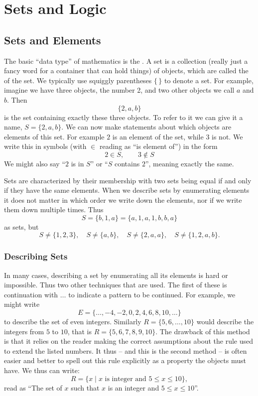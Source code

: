 \chapter{Sets and Logic}
\label{chsets}

\section{Sets and Elements}

The basic ``data type'' of mathematics is the . A set is a
collection (really just a fancy word for a container that can hold things)
of objects, which are called the  of the set. 
We typically use squiggly parentheses $\{\,\}$ to denote a set.
For example,
imagine we have three objects, the number 2, and two other objects we call
$a$ and $b$. Then 
\[
\{2,a,b\}
\]
is the set containing exactly these three objects. To refer to it we can give it
a name, $S=\{2,a,b\}$. 
We can now make statements about which objects are elements of this set. For
example $2$ is an element of the set, while $3$ is not. We write this in
symbols (with $\in$ reading as ``is element of'') in the form
\[
2\in S,\qquad 3\not\in S
\]
We might also say ``$2$ is in $S$'' or ``$S$ contains $2$'', meaning exactly
the same.

Sets are characterized by their membership with two sets being equal if and
only if they have the same elements.
When we describe sets
by enumerating elements it does not matter in which order we write down the
elements, nor if we write them down multiple times.
Thus
\[
S=\{b,1,a\}=\{a,1,a,1,b,b,a\}
\]
as sets, but 
\[
S\not=\{1,2,3\},\quad S\not=\{a,b\},\quad S\not=\{2,a,a\},\quad
S\not=\{1,2,a,b\}.
\]

\subsection{Describing Sets}

In many cases, describing a set by enumerating all its elements is
hard or impossible. Thus two other techniques that are used. The first of
these is continuation with
$\ldots$ to indicate a pattern to be continued. For example, we might write
\[
E=\{\ldots,-4,-2,0,2,4,6,8,10,\ldots\}
\]
to describe the set of even integers. Similarly
$R=\{5,6,\ldots,10\}$ would describe the integers from $5$ to $10$, that is
$R=\{5,6,7,8,9,10\}$. The drawback of this method is that it relies on the
reader making the correct assumptions about the rule used to extend the
listed numbers. It thus -- and this is the second method -- is often easier
and better to spell out this rule explicitly as a property the objects must
have. We thus can write:
\[
R=\{x\mid \mbox{$x$ is integer and $5\le x\le 10$}\},
\]
read as ``The set of $x$ such that $x$ is an integer and $5\le x\le 10$''.

